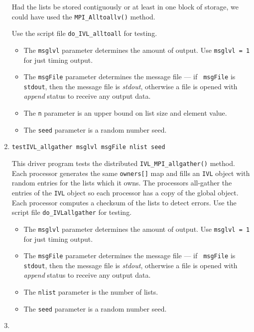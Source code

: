 \begin{enumerate}
Had the lists be stored contiguously or at least in one block of
storage, we could have used the {\tt MPI\_Alltoallv()} method.
\par
Use the script file {\tt do\_IVL\_alltoall} for testing.
\par
\begin{itemize}
\item
The {\tt msglvl} parameter determines the amount of output.
Use {\tt msglvl = 1} for just timing output.
\item
The {\tt msgFile} parameter determines the message file --- if {\tt
msgFile} is {\tt stdout}, then the message file is {\it stdout},
otherwise a file is opened with {\it append} status to receive any
output data.
\item
The {\tt n} parameter is an upper bound on list size and element value.
\item
The {\tt seed} parameter is a random number seed.
\end{itemize}
\item
\begin{verbatim}
testIVL_allgather msglvl msgFile nlist seed 
\end{verbatim}
This driver program tests the distributed 
{\tt IVL\_MPI\_allgather()} method.
Each processor generates the same {\tt owners[]} map
and fills an {\tt IVL} object with random entries for the lists
which it owns.
The processors all-gather the entries of the {\tt IVL} object so each
processor has a copy of the global object.
Each processor computes a checksum of the lists to detect errors.
Use the script file {\tt do\_IVLallgather} for testing.
\par
\begin{itemize}
\item
The {\tt msglvl} parameter determines the amount of output.
Use {\tt msglvl = 1} for just timing output.
\item
The {\tt msgFile} parameter determines the message file --- if {\tt
msgFile} is {\tt stdout}, then the message file is {\it stdout},
otherwise a file is opened with {\it append} status to receive any
output data.
\item
The {\tt nlist} parameter is the number of lists.
\item
The {\tt seed} parameter is a random number seed.
\end{itemize}
\item

\end{enumerate}
